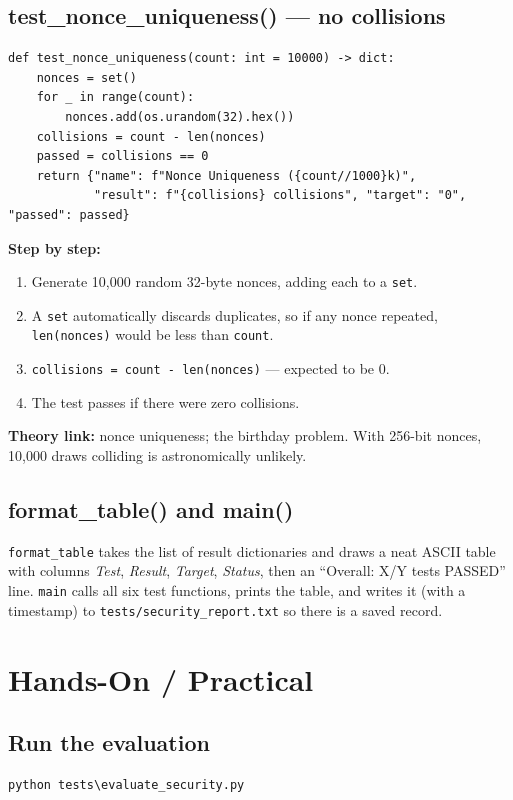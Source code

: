 \documentclass[11pt,a4paper]{report}
\begin{document}
\subsection{test\_nonce\_uniqueness() --- no collisions}
\begin{lstlisting}[style=py,caption={evaluate\_security.py --- the nonce uniqueness test.}]
def test_nonce_uniqueness(count: int = 10000) -> dict:
    nonces = set()
    for _ in range(count):
        nonces.add(os.urandom(32).hex())
    collisions = count - len(nonces)
    passed = collisions == 0
    return {"name": f"Nonce Uniqueness ({count//1000}k)",
            "result": f"{collisions} collisions", "target": "0", "passed": passed}
\end{lstlisting}
\textbf{Step by step:}
\begin{enumerate}
  \item Generate 10{,}000 random 32-byte nonces, adding each to a \texttt{set}.
  \item A \texttt{set} automatically discards duplicates, so if any nonce
        repeated, \texttt{len(nonces)} would be less than \texttt{count}.
  \item \texttt{collisions = count - len(nonces)} --- expected to be 0.
  \item The test passes if there were zero collisions.
\end{enumerate}
\textbf{Theory link:} nonce uniqueness; the birthday problem. With 256-bit
nonces, 10{,}000 draws colliding is astronomically unlikely.

\subsection{format\_table() and main()}
\texttt{format\_table} takes the list of result dictionaries and draws a neat
ASCII table with columns \emph{Test}, \emph{Result}, \emph{Target},
\emph{Status}, then an ``Overall: X/Y tests PASSED'' line. \texttt{main} calls
all six test functions, prints the table, and writes it (with a timestamp) to
\texttt{tests/security\_report.txt} so there is a saved record.

\section{Hands-On / Practical}

\subsection{Run the evaluation}
\begin{lstlisting}[style=term]
python tests\evaluate_security.py
\end{lstlisting}
\end{document}

